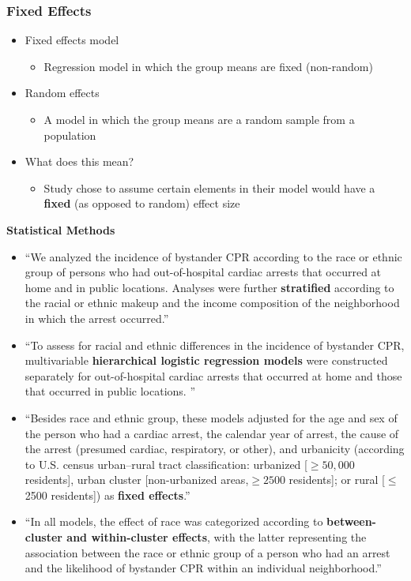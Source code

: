 \documentclass{beamer}
\begin{document}
	\begin{frame}
			\frametitle{Fixed Effects}
				\begin{itemize}
					\item Fixed effects model
						\begin{itemize}
							\item  Regression model in which the group means are fixed (non-random) 
						\end{itemize}
					\item Random effects
						\begin{itemize}
							\item A model in which the group means are a random sample from a population
						\end{itemize}
					\item What does this mean?
					\begin{itemize}
						\item Study chose to assume certain elements in their model would have a \textbf{fixed} (as opposed to random) effect size
					\end{itemize}
				\end{itemize}
		\end{frame}
		\begin{frame}
			\textbf{Statistical Methods}
			\begin{itemize}
				\tiny
				\item ``We analyzed the incidence of bystander CPR according to the race or ethnic group of persons who had out-of-hospital cardiac arrests that occurred at home and in public locations. Analyses were further \textbf{stratified} according to the racial or ethnic makeup and the income composition of the neighborhood in which the arrest occurred.''
				\item ``To assess for racial and ethnic differences in the incidence of bystander CPR, multivariable \textbf{hierarchical logistic regression models} were constructed separately for out-of-hospital cardiac arrests that occurred at home and those that occurred in public locations. ''
				\item ``Besides race and ethnic group, these models adjusted for the age and sex of the person who had a cardiac arrest, the calendar year of arrest, the cause of the arrest (presumed cardiac, respiratory, or other), and urbanicity (according to U.S. census urban–rural tract classification: urbanized [$\geq 50,000$ residents], urban cluster [non-urbanized areas,$\geq 2500$ residents]; or rural [$\leq$ 2500 residents]) as \textbf{fixed effects}.''
				\item ``In all models, the effect of race was categorized according to \textbf{between-cluster and within-cluster effects}, with the latter representing the association between the race or ethnic group of a person who had an arrest and the likelihood of bystander CPR within an individual neighborhood.''
			\end{itemize}
		\end{frame}
	
\end{document}
